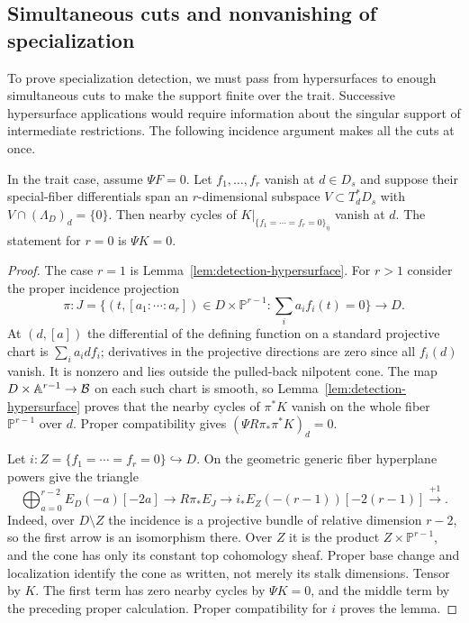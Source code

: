 \subsection{Simultaneous cuts and nonvanishing of specialization}

To prove specialization detection, we must pass from hypersurfaces to
enough simultaneous cuts to make the support finite over the trait.
Successive hypersurface applications would require information about the
singular support of intermediate restrictions.  The following incidence
argument makes all the cuts at once.

\begin{lemma}\label{lem:detection-cuts}
In the trait case, assume $\Psi F=0$.  Let $f_1,\ldots,f_r$ vanish at
$d\in D_s$ and suppose their special-fiber differentials span an
$r$-dimensional subspace $V\subset T_d^*D_s$ with
$V\cap(\Lambda_D)_d=\{0\}$.  Then nearby cycles of
$K|_{\{f_1=\cdots=f_r=0\}_{\bar\eta}}$ vanish at $d$.
The statement for $r=0$ is $\Psi K=0$.
\end{lemma}

\begin{proof}
The case $r=1$ is Lemma~\ref{lem:detection-hypersurface}.  For $r>1$
consider the proper incidence projection
\[
 \pi:J=\{(t,[a_1:\cdots:a_r])\in D\times\mathbb P^{r-1}:
                   \textstyle\sum_i a_i f_i(t)=0\}\longrightarrow D.
\]
At $(d,[a])$ the differential of the defining function on a standard
projective chart is $\sum_i a_i df_i$; derivatives in the projective
directions are zero since all $f_i(d)$ vanish.  It is nonzero and lies
outside the pulled-back nilpotent cone.  The map
$D\times\mathbb A^{r-1}\to\mathcal B$ on each such chart is smooth, so
Lemma~\ref{lem:detection-hypersurface} proves that the nearby cycles of
$\pi^*K$ vanish on the whole fiber $\mathbb P^{r-1}$ over $d$.
Proper compatibility gives $(\Psi R\pi_*\pi^*K)_d=0$.

Let $i:Z=\{f_1=\cdots=f_r=0\}\hookrightarrow D$.  On the geometric
generic fiber hyperplane powers give the triangle
\[
 \bigoplus_{a=0}^{r-2}E_D(-a)[-2a]\longrightarrow R\pi_*E_J
 \longrightarrow i_*E_Z(-(r-1))[-2(r-1)]\xrightarrow{+1}.
\]
Indeed, over $D\setminus Z$ the incidence is a projective bundle of
relative dimension $r-2$, so the first arrow is an isomorphism there.
Over $Z$ it is the product $Z\times\mathbb P^{r-1}$, and the cone has
only its constant top cohomology sheaf.  Proper base change and
localization identify the cone as written, not merely its stalk
dimensions.  Tensor by $K$.  The first term has zero nearby cycles by
$\Psi K=0$, and the middle term by the preceding proper calculation.
Proper compatibility for $i$ proves the lemma.
\end{proof}

